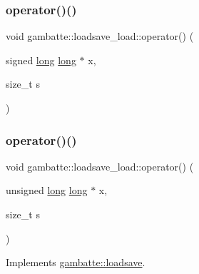 \subsubsection{\texorpdfstring{operator()()}{operator()()}\hspace{0.1cm}{\footnotesize\ttfamily [16/19]}}
{\footnotesize\ttfamily void gambatte\+::loadsave\+\_\+load\+::operator() (\begin{DoxyParamCaption}\item[{signed \hyperlink{ioapi_8h_a3c7b35ad9dab18b8310343c201f7b27e}{long} \hyperlink{ioapi_8h_a3c7b35ad9dab18b8310343c201f7b27e}{long} $\ast$}]{x,  }\item[{size\+\_\+t}]{s }\end{DoxyParamCaption})}

\mbox{\label{classgambatte_1_1loadsave__load_a3ac6797ca2311f63b2f4ec080de5f1d9}} 
\subsubsection{\texorpdfstring{operator()()}{operator()()}\hspace{0.1cm}{\footnotesize\ttfamily [17/19]}}
{\footnotesize\ttfamily void gambatte\+::loadsave\+\_\+load\+::operator() (\begin{DoxyParamCaption}\item[{unsigned \hyperlink{ioapi_8h_a3c7b35ad9dab18b8310343c201f7b27e}{long} \hyperlink{ioapi_8h_a3c7b35ad9dab18b8310343c201f7b27e}{long} $\ast$}]{x,  }\item[{size\+\_\+t}]{s }\end{DoxyParamCaption})\hspace{0.3cm}{\ttfamily [virtual]}}



Implements \hyperlink{classgambatte_1_1loadsave_a93ef67515dbf61461e7370c9cc77c8a6}{gambatte\+::loadsave}.

\mbox{\label{classgambatte_1_1loadsave__load_aa2d8402dc6fdececfd223520fc9cf0d8}} 

